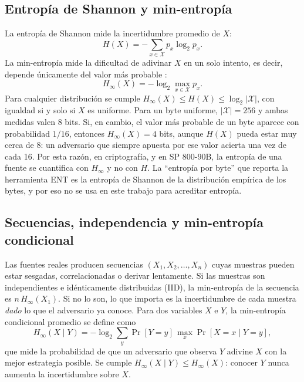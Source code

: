 \subsection{Entropía de Shannon y min-entropía}

La entropía de Shannon mide la incertidumbre promedio de $X$:
\begin{equation}
    H(X) = - \sum_{x \in \mathcal{X}} p_x \log_2 p_x .
\end{equation}
La min-entropía mide la dificultad de adivinar $X$ en un solo intento, es decir, depende únicamente del valor más probable \cite{Turan2018RecommendationGeneration}:
\begin{equation}
    H_\infty(X) = -\log_2 \max_{x \in \mathcal{X}} p_x .
    \label{eq:min_entropia}
\end{equation}
Para cualquier distribución se cumple $H_\infty(X) \leq H(X) \leq \log_2 |\mathcal{X}|$, con igualdad si y solo si $X$ es uniforme. Para un byte uniforme, $|\mathcal{X}| = 256$ y ambas medidas valen 8 bits. Si, en cambio, el valor más probable de un byte aparece con probabilidad $1/16$, entonces $H_\infty(X) = 4$ bits, aunque $H(X)$ pueda estar muy cerca de 8: un adversario que siempre apuesta por ese valor acierta una vez de cada 16. Por esta razón, en criptografía, y en SP 800-90B, la entropía de una fuente se cuantifica con $H_\infty$ y no con $H$. La ``entropía por byte'' que reporta la herramienta ENT es la entropía de Shannon de la distribución empírica de los bytes, y por eso no se usa en este trabajo para acreditar entropía.

\subsection{Secuencias, independencia y min-entropía condicional}

Las fuentes reales producen secuencias $(X_1, X_2, \ldots, X_n)$ cuyas muestras pueden estar sesgadas, correlacionadas o derivar lentamente. Si las muestras son independientes e idénticamente distribuidas (IID), la min-entropía de la secuencia es $n\,H_\infty(X_1)$. Si no lo son, lo que importa es la incertidumbre de cada muestra \emph{dado} lo que el adversario ya conoce. Para dos variables $X$ e $Y$, la min-entropía condicional promedio se define como
\begin{equation}
    H_\infty(X \mid Y) = -\log_2 \sum_{y} \Pr[Y = y]\, \max_{x} \Pr[X = x \mid Y = y],
    \label{eq:min_entropia_condicional}
\end{equation}
que mide la probabilidad de que un adversario que observa $Y$ adivine $X$ con la mejor estrategia posible. Se cumple $H_\infty(X \mid Y) \leq H_\infty(X)$: conocer $Y$ nunca aumenta la incertidumbre sobre $X$.

